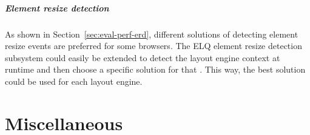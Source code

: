 \documentclass[a4paper,11pt]{kth-mag}
\begin{document}
      \paragraph{Element resize detection}
      As shown in Section~\ref{sec:eval-perf-erd}, different solutions of detecting \gls{element} resize events are preferred for some \glspl{browser}.
      The \gls{ELQ} \gls{element} resize detection subsystem could easily be extended to detect the \gls{layout engine} context at runtime and then choose a specific solution for that .
      This way, the best solution could be used for each \gls{layout engine}.


  \printbibliography
  \clearpage
  \printnoidxglossary[sort=standard, type=main]
  \printnoidxglossary[sort=standard, type=\acronymtype]
  \appendix
  \addappheadtotoc
    
    \chapter{Miscellaneous}
\end{document}

